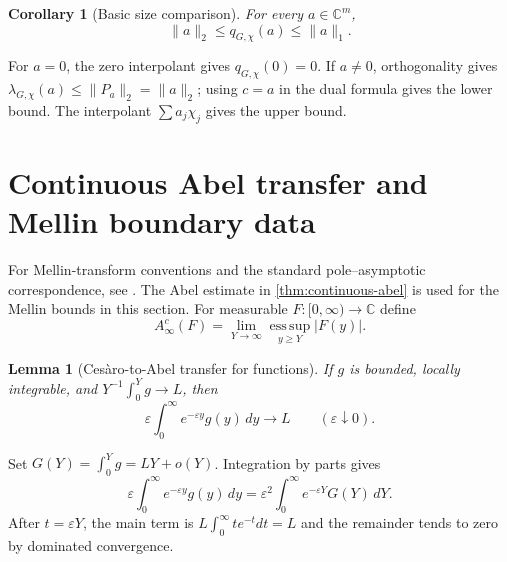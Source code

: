 \documentclass[12pt,a4paper,twoside]{extarticle}
\makeatletter
\theoremstyle{compactplain}
\newtheorem{lemma}[theorem]{Lemma}
\newtheorem{corollary}[theorem]{Corollary}
\theoremstyle{compactdef}
\renewenvironment{proof}[1][\proofname]{\par\pushQED{\qed}\normalfont
  \topsep2pt\trivlist\item[\hskip\labelsep\bfseries #1\@addpunct{.}]\ignorespaces}
 {\popQED\endtrivlist\@endpefalse}
\newcommand{\esssup}{\operatorname*{ess\,sup}}
\makeatother
\begin{document}
\begin{corollary}[Basic size comparison]\label{cor:basic-size}
For every $a\in\mathbb C^m$,
\[
 \|a\|_2\le q_{G,\chi}(a)\le\|a\|_1.
\]
\end{corollary}
\begin{proof}
For $a=0$, the zero interpolant gives $q_{G,\chi}(0)=0$.  If $a\ne0$, orthogonality gives $\lambda_{G,\chi}(a)\le\|P_a\|_2=\|a\|_2$; using $c=a$ in the dual formula gives the lower bound.  The interpolant $\sum a_j\chi_j$ gives the upper bound.
\end{proof}

\section{Continuous Abel transfer and Mellin boundary data}\label{sec:continuous-transfer}
For Mellin-transform conventions and the standard pole--asymptotic correspondence, see \cite{zagier}.  The Abel estimate in \cref{thm:continuous-abel} is used for the Mellin bounds in this section.
For measurable $F:[0,\infty)\to\mathbb C$ define
\[
 A_\infty^c(F)=\lim_{Y\to\infty}\esssup_{y\ge Y}|F(y)|.
\]

\begin{lemma}[Ces\`aro-to-Abel transfer for functions]\label{lem:cesaro-abel-cont}
If $g$ is bounded, locally integrable, and $Y^{-1}\int_0^Yg\to L$, then
\[
 \varepsilon\int_0^\infty e^{-\varepsilon y}g(y)\,dy\to L
 \qquad(\varepsilon\downarrow0).
\]
\end{lemma}
\begin{proof}
Set $G(Y)=\int_0^Yg=LY+o(Y)$.  Integration by parts gives
\[
 \varepsilon\int_0^\infty e^{-\varepsilon y}g(y)\,dy
 =\varepsilon^2\int_0^\infty e^{-\varepsilon Y}G(Y)\,dY.
\]
After $t=\varepsilon Y$, the main term is $L\int_0^\infty te^{-t}dt=L$ and the remainder tends to zero by dominated convergence.
\end{proof}
\end{document}
